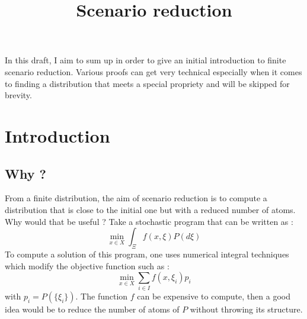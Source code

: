 \documentclass{amsart}
\title{Scenario reduction}
\begin{document}
\LinesNumbered
{}
\maketitle
In this draft, I aim to sum up \cite{rujeerapaiboon_scenario_2022} in order to give an initial introduction to finite scenario reduction. Various proofs can get very technical especially when it comes to finding a distribution that meets a special propriety and will be skipped for brevity. 

\section{Introduction}
\subsection{Why ?}
From a finite distribution, the aim of scenario reduction is to compute a distribution that is close to the initial one but with a reduced number of atoms. Why would that be useful ? Take a stochastic program that can be written as : 
$$
\min_{x\in X}\int_\Xi f\left(x,\xi\right)P\left(d\xi\right)
$$
To compute a solution of this program, one uses numerical integral techniques which modify the objective function such as :
$$
\min_{x\in X}\sum_{i\in I} f\left(x,\xi_i\right)p_i
$$
with $p_i=P\left(\{\xi_i\}\right)$. The function $f$ can be expensive to compute, then a good idea would be to reduce the number of atoms of $P$ without throwing its structure.
\end{document}
